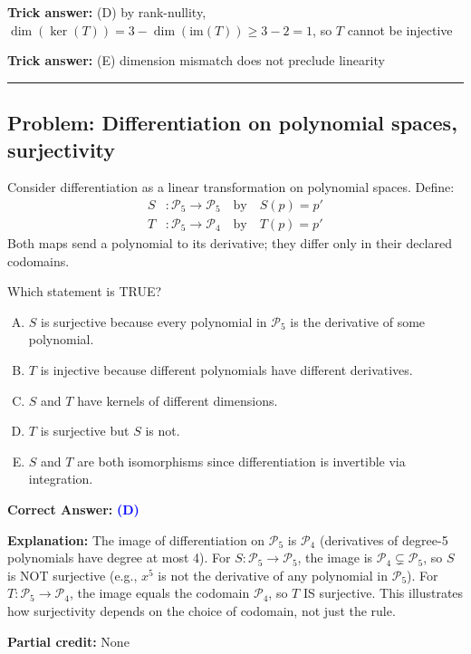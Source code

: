 \documentclass[12pt]{amsart}
\newcommand{\divider}{
  \vspace{-1em}
  \noindent
  \raisebox{-0.15ex}{\textbullet}%
  \hspace{0.5em}%
  \rule[0.5ex]{0.95\textwidth}{1.0pt}%
  \hspace{0.5em}%
  \raisebox{-0.15ex}{\textbullet}%
  \vspace{0em}
}
\begin{document}
\textbf{Trick answer:} (D) by rank-nullity, $\dim(\ker(T)) = 3 - \dim(\text{im}(T)) \geq 3 - 2 = 1$, so $T$ cannot be injective

\textbf{Trick answer:} (E) dimension mismatch does not preclude linearity

\divider

\subsection*{Problem: Differentiation on polynomial spaces, surjectivity}

Consider differentiation as a linear transformation on polynomial spaces. Define:
\begin{align*}
S &: \mathcal{P}_5 \to \mathcal{P}_5 \quad \text{by} \quad S(p) = p' \\
T &: \mathcal{P}_5 \to \mathcal{P}_4 \quad \text{by} \quad T(p) = p'
\end{align*}
Both maps send a polynomial to its derivative; they differ only in their declared codomains.

Which statement is TRUE?

\begin{enumerate}[(A)]
\item $S$ is surjective because every polynomial in $\mathcal{P}_5$ is the derivative of some polynomial.
\item $T$ is injective because different polynomials have different derivatives.
\item $S$ and $T$ have kernels of different dimensions.
\item $T$ is surjective but $S$ is not.
\item $S$ and $T$ are both isomorphisms since differentiation is invertible via integration.
\end{enumerate}

\textbf{Correct Answer:} \textcolor{blue}{\textbf{(D)}}

\textbf{Explanation:} The image of differentiation on $\mathcal{P}_5$ is $\mathcal{P}_4$ (derivatives of degree-5 polynomials have degree at most 4). For $S: \mathcal{P}_5 \to \mathcal{P}_5$, the image is $\mathcal{P}_4 \subsetneq \mathcal{P}_5$, so $S$ is NOT surjective (e.g., $x^5$ is not the derivative of any polynomial in $\mathcal{P}_5$). For $T: \mathcal{P}_5 \to \mathcal{P}_4$, the image equals the codomain $\mathcal{P}_4$, so $T$ IS surjective. This illustrates how surjectivity depends on the choice of codomain, not just the rule.

\textbf{Partial credit:} None
\end{document}
